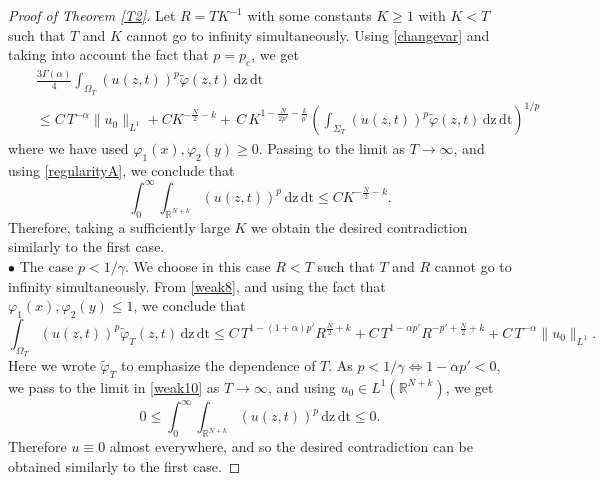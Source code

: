 \documentclass[reqno,11pt]{amsart}
\numberwithin{equation}{section}
\def\R{{\mathbb {R}}}
\def\R{\mathbb{R}}
\begin{document}
\begin{proof}[Proof of Theorem \ref{T2}]
	Let $R=TK^{-1}$ with some constants $K\ge 1$ with $K<T$ such that $T$ and $K$ cannot go to infinity simultaneously. Using \eqref{changevar} and taking into account the fact that $p=p_c$, we get
	\begin{eqnarray*}
		&{}&\frac{3\Gamma(\alpha)}{4}\int_{\Omega_T}(u(z,t))^{p}\widetilde{\varphi}(z,t)\,\mathrm{dz}\,\mathrm{dt}\\
		&{}&\leq C\,T^{-\alpha}\|u_0\|_{L^1}+CK^{-\frac{N}{2}-k} +\,C\,K^{1-\frac{N}{2p'}-\frac{k}{p'}}\left(\int_{\Sigma_T}(u(z,t))^{p}\widetilde{\varphi}(z,t)\,\mathrm{dz}\,\mathrm{dt}\right)^{1/p}
	\end{eqnarray*}
	where we have used $\varphi_1(x),\varphi_2(y)\geq 0$. Passing to the limit as $T\rightarrow\infty$, and using \eqref{regularityA}, we conclude that
	$$\int_0^\infty\int_{\R^{N+k}}(u(z,t))^{p}\,\mathrm{dz}\,\mathrm{dt}\leq CK^{-\frac{N}{2}-k}.$$
	Therefore, taking a sufficiently large $K$ we obtain the desired contradiction similarly to the first case.\\
	
	\noindent $\bullet$ The case $p<1/\gamma$. We choose in this case $R<T$ such that $T$ and $R$ cannot go to infinity simultaneously. From \eqref{weak8}, and using the fact that $\varphi_1(x),\varphi_2(y)\leq 1$, we conclude that
	\begin{equation}\label{weak10}
		\int_{\Omega_T}(u(z,t))^{p}\widetilde{\varphi}_T(z,t)\,\mathrm{dz}\,\mathrm{dt}\leq C\,T^{1-(1+\alpha)p'}R^{\frac{N}{2}+k}+C\,T^{1-\alpha p'}R^{-p'+\frac{N}{2}+k}+C\,T^{-\alpha}\|u_0\|_{L^1}.
	\end{equation}
	Here we wrote $\widetilde{\varphi}_T$ to emphasize the dependence of $T$. As $p<1/\gamma\Longleftrightarrow 1-\alpha p'<0$, we pass to the limit in \eqref{weak10} as $T\rightarrow\infty$, and using $u_0\in L^1(\mathbb{R}^{N+k})$, we get
	$$0\leq \int_0^\infty\int_{\R^{N+k}}(u(z,t))^{p}\,\mathrm{dz}\,\mathrm{dt}\leq 0.$$
	Therefore $u\equiv 0$ almost everywhere, and so the desired contradiction can be obtained similarly to the first case.
\end{proof}
\end{document}
